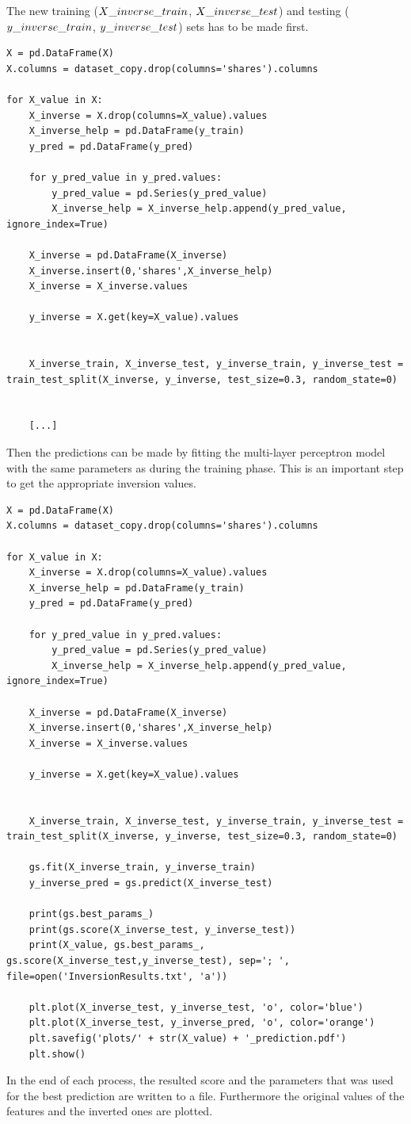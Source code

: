 The new training ($X\char`_inverse\char`_train$, $X\char`_inverse\char`_test$) and testing ($y\char`_inverse\char`_train$, $y\char`_inverse\char`_test$) sets has to be made first.
\begin{lstlisting}
X = pd.DataFrame(X)
X.columns = dataset_copy.drop(columns='shares').columns

for X_value in X:
	X_inverse = X.drop(columns=X_value).values
	X_inverse_help = pd.DataFrame(y_train)
	y_pred = pd.DataFrame(y_pred)

	for y_pred_value in y_pred.values:
		y_pred_value = pd.Series(y_pred_value)
		X_inverse_help = X_inverse_help.append(y_pred_value, ignore_index=True)
		
	X_inverse = pd.DataFrame(X_inverse)
	X_inverse.insert(0,'shares',X_inverse_help)
	X_inverse = X_inverse.values

	y_inverse = X.get(key=X_value).values


	X_inverse_train, X_inverse_test, y_inverse_train, y_inverse_test = train_test_split(X_inverse, y_inverse, test_size=0.3, random_state=0)


	[...]
\end{lstlisting}
Then the predictions can be made by fitting the multi-layer perceptron model with the same parameters as during the training phase. This is an  important step to get the appropriate inversion values.
\begin{lstlisting}
X = pd.DataFrame(X)
X.columns = dataset_copy.drop(columns='shares').columns

for X_value in X:
	X_inverse = X.drop(columns=X_value).values
	X_inverse_help = pd.DataFrame(y_train)
	y_pred = pd.DataFrame(y_pred)

	for y_pred_value in y_pred.values:
		y_pred_value = pd.Series(y_pred_value)
		X_inverse_help = X_inverse_help.append(y_pred_value, ignore_index=True)

	X_inverse = pd.DataFrame(X_inverse)
	X_inverse.insert(0,'shares',X_inverse_help)
	X_inverse = X_inverse.values

	y_inverse = X.get(key=X_value).values


	X_inverse_train, X_inverse_test, y_inverse_train, y_inverse_test = train_test_split(X_inverse, y_inverse, test_size=0.3, random_state=0)

	gs.fit(X_inverse_train, y_inverse_train)
	y_inverse_pred = gs.predict(X_inverse_test)

	print(gs.best_params_)
	print(gs.score(X_inverse_test, y_inverse_test))
	print(X_value, gs.best_params_, gs.score(X_inverse_test,y_inverse_test), sep='; ', file=open('InversionResults.txt', 'a'))

	plt.plot(X_inverse_test, y_inverse_test, 'o', color='blue')
	plt.plot(X_inverse_test, y_inverse_pred, 'o', color='orange')
	plt.savefig('plots/' + str(X_value) + '_prediction.pdf')
	plt.show()
\end{lstlisting}
In the end of each process, the resulted score and the parameters that was used for the best prediction are written to a file. Furthermore the original values of the features and the inverted ones are plotted.



